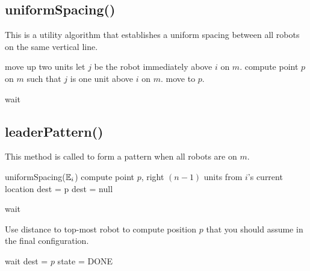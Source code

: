 \documentclass[preprint,10pt]{elsarticle}
\begin{document}
\subsection{uniformSpacing()} 
	This is a utility algorithm that establishes a uniform spacing between all robots on
	the same vertical line.
\begin{algorithm}[H]
\begin{algorithmic}[1]
		\State move up two units
	\EndIf
	\State let $j$ be the robot immediately above $i$ on $m$.
	\State compute point $p$ on $m$ such that $j$ is one
	unit above $i$ on $m$.
	\State move to $p$.

		\State wait
	\EndWhile
\EndProcedure
\end{algorithmic}
\end{algorithm}

\subsection{leaderPattern()} 
	This method is called to form a pattern when all robots are on $m$.
\begin{algorithm}[H]
\begin{algorithmic}[1]

	uniformSpacing($\mathbb{E}_i$) %
		\State compute point $p$, right $(n-1)$ units from $i$'s current location
		\State dest = p
	\Else
		dest = null
	\EndIf

		\State wait
	\EndWhile

	\State Use distance to top-most robot to compute position $p$ that you
	should assume in the final configuration.

		\State wait
	\EndWhile
	\State dest = $p$
	\State state = DONE


\EndProcedure
\end{algorithmic}
\end{algorithm}

 

\end{document}
